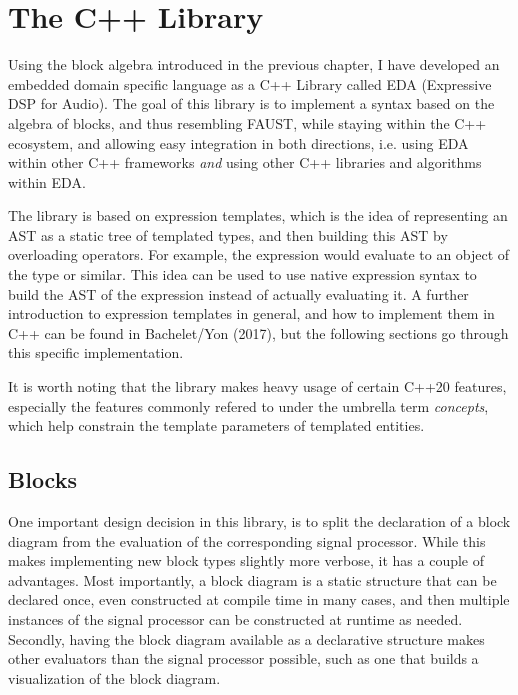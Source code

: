 \chapter{The C++ Library}
\label{chap:cpp_lib}

Using the block algebra introduced in the previous chapter, I have developed an embedded domain specific
language as a C++ Library called EDA (Expressive DSP for Audio). The goal of this library is to implement a
syntax based on the algebra of blocks, and thus resembling FAUST, while staying within the C++ ecosystem, and
allowing easy integration in both directions, i.e. using EDA within other C++ frameworks
\emph{and} using other C++ libraries and algorithms within EDA.

The library is based on expression templates\autocite{bachelet}, which is the idea of representing an AST
as a static tree of templated types, and then building this AST by overloading operators. For example, the
expression
 would evaluate to an object of the type  or similar. This idea can
be used to use native expression syntax to build the AST of the expression instead of actually evaluating it.
A further introduction to expression templates in general, and how to implement them in C++ can be found in
Bachelet/Yon (2017)\autocite{bachelet}, but the following sections go through this specific
implementation.

It is worth noting that the library makes heavy usage of certain C++20\autocite{C++Std} features,
especially the features commonly refered to under the umbrella term
\emph{concepts}\autocite{cppr:concepts}, which help constrain the template parameters of templated
entities.

\section{Blocks}

One important design decision in this library, is to split the declaration of a block diagram from the
evaluation of the corresponding signal processor. While this makes implementing new block types slightly more
verbose, it has a couple of advantages. Most importantly, a block diagram is a static structure that can be
declared once, even constructed at compile time in many cases, and then multiple instances of the signal
processor can be constructed at runtime as needed. Secondly, having the block diagram available as a
declarative structure makes other evaluators than the signal processor possible, such as one that builds a
visualization of the block diagram.

